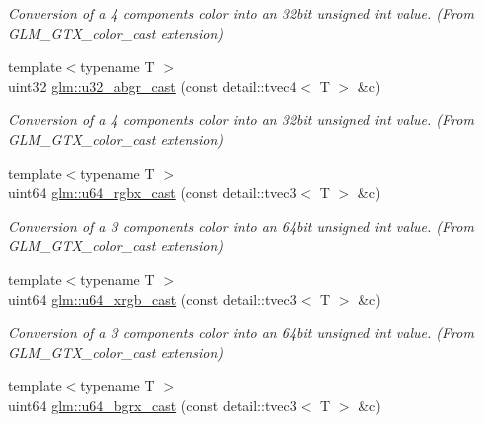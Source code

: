 \begin{DoxyCompactItemize}
\begin{DoxyCompactList}\small\item\em Conversion of a 4 components color into an 32bit unsigned int value. (From G\+L\+M\+\_\+\+G\+T\+X\+\_\+color\+\_\+cast extension) \end{DoxyCompactList}\item 
\hypertarget{group__gtx__color__cast_gaa928bde161bdf391317d96b20eb1a395}{}{\footnotesize template$<$typename T $>$ }\\uint32 \hyperlink{group__gtx__color__cast_gaa928bde161bdf391317d96b20eb1a395}{glm\+::u32\+\_\+abgr\+\_\+cast} (const detail\+::tvec4$<$ T $>$ \&c)\label{group__gtx__color__cast_gaa928bde161bdf391317d96b20eb1a395}

\begin{DoxyCompactList}\small\item\em Conversion of a 4 components color into an 32bit unsigned int value. (From G\+L\+M\+\_\+\+G\+T\+X\+\_\+color\+\_\+cast extension) \end{DoxyCompactList}\item 
\hypertarget{group__gtx__color__cast_gacd63fce723a7a34b0432e323f9201171}{}{\footnotesize template$<$typename T $>$ }\\uint64 \hyperlink{group__gtx__color__cast_gacd63fce723a7a34b0432e323f9201171}{glm\+::u64\+\_\+rgbx\+\_\+cast} (const detail\+::tvec3$<$ T $>$ \&c)\label{group__gtx__color__cast_gacd63fce723a7a34b0432e323f9201171}

\begin{DoxyCompactList}\small\item\em Conversion of a 3 components color into an 64bit unsigned int value. (From G\+L\+M\+\_\+\+G\+T\+X\+\_\+color\+\_\+cast extension) \end{DoxyCompactList}\item 
\hypertarget{group__gtx__color__cast_ga7a75746544ae028cc991152a4c0dc01a}{}{\footnotesize template$<$typename T $>$ }\\uint64 \hyperlink{group__gtx__color__cast_ga7a75746544ae028cc991152a4c0dc01a}{glm\+::u64\+\_\+xrgb\+\_\+cast} (const detail\+::tvec3$<$ T $>$ \&c)\label{group__gtx__color__cast_ga7a75746544ae028cc991152a4c0dc01a}

\begin{DoxyCompactList}\small\item\em Conversion of a 3 components color into an 64bit unsigned int value. (From G\+L\+M\+\_\+\+G\+T\+X\+\_\+color\+\_\+cast extension) \end{DoxyCompactList}\item 
\hypertarget{group__gtx__color__cast_gad75bc921ee693a306693d760536e9bb8}{}{\footnotesize template$<$typename T $>$ }\\uint64 \hyperlink{group__gtx__color__cast_gad75bc921ee693a306693d760536e9bb8}{glm\+::u64\+\_\+bgrx\+\_\+cast} (const detail\+::tvec3$<$ T $>$ \&c)\label{group__gtx__color__cast_gad75bc921ee693a306693d760536e9bb8}


\end{DoxyCompactItemize}
